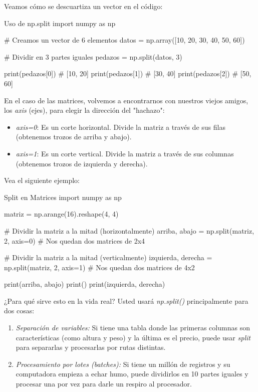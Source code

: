 Veamos cómo se descuartiza un vector en el código:

\begin{pycode}{Uso de np.split}
import numpy as np

# Creamos un vector de 6 elementos
datos = np.array([10, 20, 30, 40, 50, 60])

# Dividir en 3 partes iguales
pedazos = np.split(datos, 3)

print(pedazos[0]) # [10, 20]
print(pedazos[1]) # [30, 40]
print(pedazos[2]) # [50, 60]
\end{pycode}

En el caso de las matrices, volvemos a encontrarnos con nuestros viejos amigos, los \textit{axis} (ejes), para elegir la dirección del "hachazo":
\begin{itemize}
\item \textit{axis=0}: Es un corte horizontal. Divide la matriz a través de sus filas (obtenemos trozos de arriba y abajo).
\item \textit{axis=1}: Es un corte vertical. Divide la matriz a través de sus columnas (obtenemos trozos de izquierda y derecha).
\end{itemize}

Vea el siguiente ejemplo:
\begin{pycode}{Split en Matrices}
import numpy as np

matriz = np.arange(16).reshape(4, 4)

# Dividir la matriz a la mitad (horizontalmente)
arriba, abajo = np.split(matriz, 2, axis=0) # Nos quedan dos matrices de 2x4

# Dividir la matriz a la mitad (verticalmente)
izquierda, derecha = np.split(matriz, 2, axis=1) # Nos quedan dos matrices de 4x2

print(arriba, abajo)
print()
print(izquierda, derecha)

\end{pycode}

¿Para qué sirve esto en la vida real? Usted usará \textit{np.split()} principalmente para dos cosas:
\begin{enumerate}
\item \textit{Separación de variables:} Si tiene una tabla donde las primeras columnas son características (como altura y peso) y la última es el precio, puede usar \textit{split} para separarlas y procesarlas por rutas distintas.
\item \textit{Procesamiento por lotes (\textit{batches}):} Si tiene un millón de registros y su computadora empieza a echar humo, puede dividirlos en 10 partes iguales y procesar una por vez para darle un respiro al procesador.
\end{enumerate}

